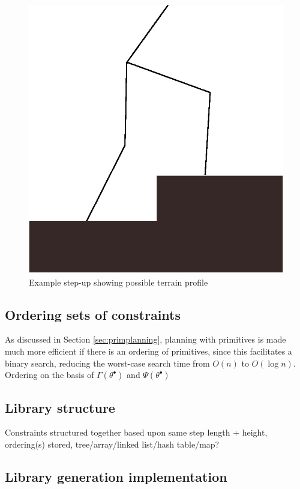 \begin{figure}
	\centering
	\includegraphics[width=0.5\linewidth]{4VirtConstLib/stepup.eps}
	\caption{Example step-up showing possible terrain profile}
	\label{fig:stepup}
\end{figure}

\subsection{Ordering sets of constraints}
As discussed in Section \ref{sec:primplanning}, planning with primitives is made much more efficient if there is an ordering of primitives, since this facilitates a binary search, reducing the worst-case search time from $O(n)$ to $O(\log n)$. Ordering on the basis of $\Gamma(\theta^\bullet)$ and $\Psi(\theta^\bullet)$

\subsection{Library structure}
Constraints structured together based upon same step length + height, ordering(s) stored, tree/array/linked list/hash table/map?

\subsection{Library generation implementation}
